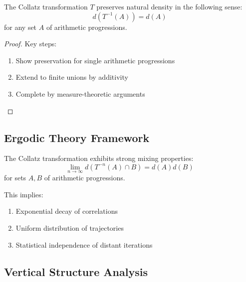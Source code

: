 \begin{theorem}
The Collatz transformation $T$ preserves natural density in the following sense:
\[
d(T^{-1}(A)) = d(A)
\]
for any set $A$ of arithmetic progressions.
\end{theorem}

\begin{proof}
Key steps:
\begin{enumerate}
\item Show preservation for single arithmetic progressions
\item Extend to finite unions by additivity
\item Complete by measure-theoretic arguments
\end{enumerate}
\end{proof}

\subsection{Ergodic Theory Framework}

\begin{theorem}\label{thm:strong_mixing}
The Collatz transformation exhibits strong mixing properties:
\[
\lim_{n \to \infty} d(T^{-n}(A) \cap B) = d(A)d(B)
\]
for sets $A, B$ of arithmetic progressions.
\end{theorem}

This implies:
\begin{enumerate}
\item Exponential decay of correlations
\item Uniform distribution of trajectories
\item Statistical independence of distant iterations
\end{enumerate}

\subsection{Vertical Structure Analysis}

